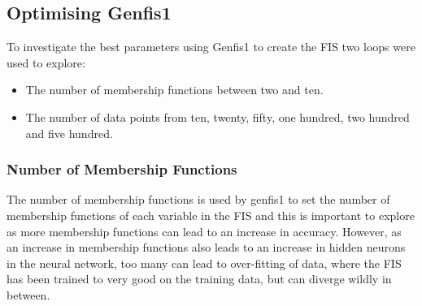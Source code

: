 \documentclass[11.5pt, twoside, a4paper]{article}
\begin{document}
\subsection{Optimising Genfis1}
To investigate the best parameters using Genfis1 to create the FIS two loops were used to explore:
\begin{itemize}
\item The number of membership functions between two and ten.
\item The number of data points from ten, twenty, fifty, one hundred, two hundred and five hundred.
\end{itemize}

\subsubsection{Number of Membership Functions}
The number of membership functions is used by genfis1 to set the number of membership functions of each variable in the FIS \cite{genfis1} and this is important to explore as more membership functions can lead to an increase in accuracy. However, as an increase in membership functions also leads to an increase in hidden neurons in the neural network, too many can lead to over-fitting of data, where the FIS has been trained to very good on the training data, but can diverge wildly in between. 

\begin{table} 
\caption{Section from Table \ref{tab:2LinkGenfis1} \label{tab:section2LinkGenfis1}}
\end{table}
\end{document}
